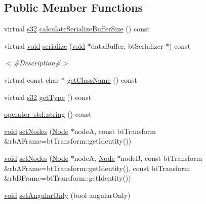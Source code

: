\subsection*{Public Member Functions}
\begin{DoxyCompactItemize}
\item 
virtual \mbox{\hyperlink{_util_8h_aa62c75d314a0d1f37f79c4b73b2292e2}{s32}} \mbox{\hyperlink{classnjli_1_1_physics_constraint_cone_twist_a0d6e6a5ffced973aca49898094745d75}{calculate\+Serialize\+Buffer\+Size}} () const
\item 
virtual \mbox{\hyperlink{_thread_8h_af1e856da2e658414cb2456cb6f7ebc66}{void}} \mbox{\hyperlink{classnjli_1_1_physics_constraint_cone_twist_a0525276852c678e2dcda35d864d035db}{serialize}} (\mbox{\hyperlink{_thread_8h_af1e856da2e658414cb2456cb6f7ebc66}{void}} $\ast$data\+Buffer, bt\+Serializer $\ast$) const
\begin{DoxyCompactList}\small\item\em $<$\#\+Description\#$>$ \end{DoxyCompactList}\item 
virtual const char $\ast$ \mbox{\hyperlink{classnjli_1_1_physics_constraint_cone_twist_af65735ee847bd4d4bc72978f52c238ec}{get\+Class\+Name}} () const
\item 
virtual \mbox{\hyperlink{_util_8h_aa62c75d314a0d1f37f79c4b73b2292e2}{s32}} \mbox{\hyperlink{classnjli_1_1_physics_constraint_cone_twist_a78562bcb3f15cde1a2628732cc917fd7}{get\+Type}} () const
\item 
\mbox{\hyperlink{classnjli_1_1_physics_constraint_cone_twist_ad24f7b9f50dded24bcef6a3ca0683a1c}{operator std\+::string}} () const
\item 
\mbox{\hyperlink{_thread_8h_af1e856da2e658414cb2456cb6f7ebc66}{void}} \mbox{\hyperlink{classnjli_1_1_physics_constraint_cone_twist_a62ccb09aa4eb5e21fa325888b619b434}{set\+Nodes}} (\mbox{\hyperlink{classnjli_1_1_node}{Node}} $\ast$nodeA, const bt\+Transform \&rb\+A\+Frame=bt\+Transform\+::get\+Identity())
\item 
\mbox{\hyperlink{_thread_8h_af1e856da2e658414cb2456cb6f7ebc66}{void}} \mbox{\hyperlink{classnjli_1_1_physics_constraint_cone_twist_ade9557985d29d2dbef78d0dc232ed367}{set\+Nodes}} (\mbox{\hyperlink{classnjli_1_1_node}{Node}} $\ast$nodeA, \mbox{\hyperlink{classnjli_1_1_node}{Node}} $\ast$nodeB, const bt\+Transform \&rb\+A\+Frame=bt\+Transform\+::get\+Identity(), const bt\+Transform \&rb\+B\+Frame=bt\+Transform\+::get\+Identity())
\item 
\mbox{\hyperlink{_thread_8h_af1e856da2e658414cb2456cb6f7ebc66}{void}} \mbox{\hyperlink{classnjli_1_1_physics_constraint_cone_twist_a6c8c071ebac0a8b00d66a17044c9d62a}{set\+Angular\+Only}} (bool angular\+Only)

\end{DoxyCompactItemize}
